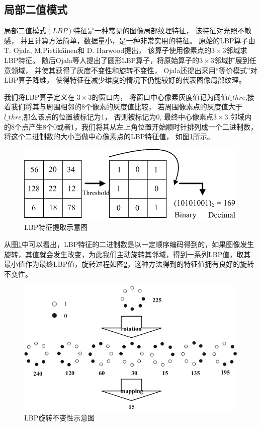 \subsection{局部二值模式}

局部二值模式$(LBP)$特征是一种常见的图像局部纹理特征，
该特征对光照不敏感，
并且计算方法简单，数据量小，是一种非常实用的特征。
原始的LBP算子由T. Ojala, M.Pietikäinen和 D. Harwood提出，
该算子使用像素点的$3\times 3$邻域求LBP特征。
随后Ojala等人提出了圆形LBP算子\cite{ojala2002multiresolution}，将原始算子的$3\times 3$邻域扩展到任意领域，
并使其获得了灰度不变性和旋转不变性，
Ojala还提出采用“等价模式”\cite{ojala2002multiresolution}对LBP算子降维，
使得特征在减少维度的情况下仍能较好的代表图像局部纹理。

我们将LBP算子定义在
$3\times 3$的窗口内，
将窗口中心像素灰度值记为阈值$l\_thre$,接着我们将其与周围相邻的8个像素的灰度值比较，
若周围像素点的灰度值大于$l\_thre$,那么该点的位置被标记为1，
否则被标记为0,
最终中心像素点$3\times 3$
邻域内的8个点产生8个0或者1，我们将其从左上角位置开始顺时针排列成一个二进制数，将这个二进制数的大小当做中心像素点的LBP特征值，
如图\ref{fig:lbp}所示。
\begin{figure}[htbp]
\centering
\includegraphics[width=1.0\linewidth]{figures/lbp.png}
\caption{LBP特征提取示意图}
\label{fig:lbp}
\end{figure}
从图\ref{fig:lbp}中可以看出，LBP特征的二进制数是以一定顺序编码得到的，如果图像发生旋转，其值就会发生改变，为此我们主动旋转其邻域，得到一系列LBP值，取其最小值作为最终LBP值，旋转过程如图\ref{fig:lbp2}，这种方法得到的特征值拥有良好的旋转不变性。
\begin{figure}[htbp]
\centering
\includegraphics[width=1.0\linewidth]{figures/lbp2.png}
\caption{LBP旋转不变性示意图}
\label{fig:lbp2}
\end{figure}

